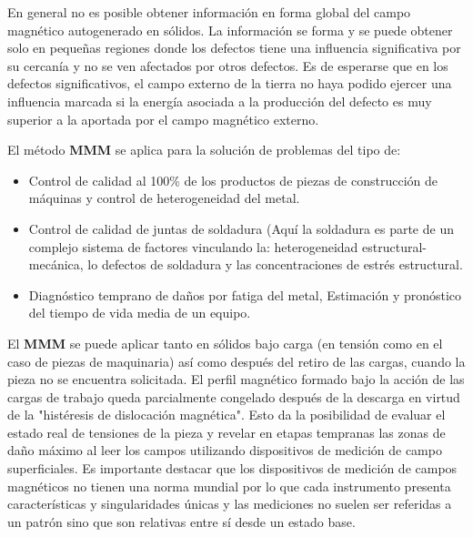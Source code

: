 En general no es posible obtener información en forma global del campo magnético autogenerado en sólidos. La información se forma y se puede obtener solo en pequeñas regiones donde los defectos tiene una influencia significativa por su cercanía y no se ven afectados por otros defectos. Es de esperarse que en los defectos significativos, el campo externo de la tierra no haya podido ejercer una influencia marcada si la energía asociada a la producción del defecto es muy superior a la aportada por el campo magnético externo.

El método \textbf{MMM} se aplica para la solución de problemas del tipo de:


\begin{itemize}
	\item Control de calidad al 100\% de los productos de piezas de construcción de máquinas y control de heterogeneidad del metal.
	
	\item Control de calidad de juntas de soldadura (Aquí la soldadura es parte de un complejo sistema de factores vinculando la: heterogeneidad estructural-mecánica, lo defectos de soldadura y las concentraciones de estrés estructural.
	
	\item Diagnóstico temprano de daños por fatiga del metal, Estimación y pronóstico del tiempo de vida media de un equipo.
	
\end{itemize}

El \textbf{MMM} se puede aplicar tanto en sólidos bajo carga (en tensión como en el caso de piezas de maquinaria) así como después del retiro de las cargas, cuando la pieza no se encuentra solicitada. El perfil magnético formado bajo la acción de las cargas de trabajo queda parcialmente congelado después de la descarga en virtud de la "histéresis de dislocación magnética". Esto da la posibilidad de evaluar el estado real de tensiones de la pieza y revelar en etapas tempranas las zonas de daño máximo al leer los campos utilizando dispositivos de medición de campo superficiales. Es importante destacar que los dispositivos de medición de campos magnéticos no tienen una norma mundial por lo que cada instrumento presenta características y singularidades únicas y las mediciones no suelen ser referidas a un patrón sino que son relativas entre sí desde un estado base.

